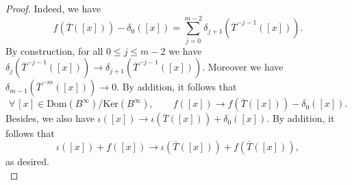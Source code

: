 \documentclass[12pt]{amsart}
\theoremstyle{definition}
\newcommand{\<}{\langle}   %
\renewcommand{\>}{\rangle} %
\begin{document}
\begin{proof}
Indeed, we have 
\begin{equation*}
    f(\overline{T}([x])) - \delta_0([x]) = \sum_{j=0}^{m-2} \delta_{j+1}(\overline{T}^{-j-1}([x])).
\end{equation*}
By construction, for all $0 \leq j \leq m-2$ we have $\delta_j(\overline{T}^{-j-1}([x])) \to \delta_{j+1}(\overline{T}^{-j-1}([x]))$. Moreover we have $\delta_{m-1}(\overline{T}^{-m}([x])) \to 0$. By addition, it follows that 
\begin{equation*}
    \forall\, [x] \in \mathrm{Dom}(B^{\infty})/\mathrm{Ker}(B^{\infty}), \qquad f([x]) \to f(\overline{T}([x])) - \delta_0([x]).
\end{equation*}
Besides, we also have $\iota([x]) \to \iota(\overline{T}([x])) + \delta_0([x])$. By addition, it follows that 
\begin{equation*}
    \iota([x]) + f([x]) \to \iota(\overline{T}([x])) + f(\overline{T}([x])),
\end{equation*}
as desired.\\


\end{proof}
\end{document}

